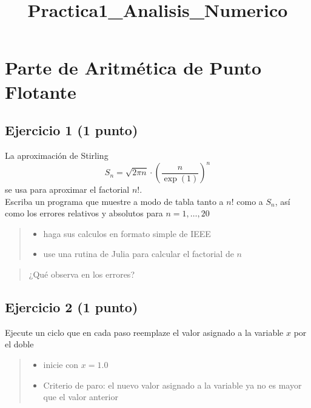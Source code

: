 \documentclass[11pt]{article}
\title{Practica1\_Analisis\_Numerico}
\providecommand{\tightlist}{%
      \setlength{\itemsep}{0pt}\setlength{\parskip}{0pt}}
\begin{document}
    
    
    \maketitle
    
    

    
    \section{Parte de Aritmética de Punto
Flotante}\label{parte-de-aritmuxe9tica-de-punto-flotante}

    \subsection{Ejercicio 1 (1 punto)}\label{ejercicio-1}
 La aproximación de Stirling
\[S_n=\sqrt{2\pi n}\cdot\left(\dfrac{n}{\exp(1)}\right)^n\] se usa para
aproximar el factorial \(n!\). \\
Escriba un programa que muestre a modo de tabla tanto a \(n!\) como a
\(S_n\), así como los errores relativos y absolutos para
\(n=1,\dots,20\) 

    \begin{quote}
\begin{itemize}
\tightlist
\item
   haga sus calculos en formato simple de IEEE
\item
   use una rutina de Julia para calcular el factorial de \(n\) 
\end{itemize}
\end{quote}

    \begin{quote}
 ¿Qué observa en los errores?
\end{quote}

    \subsection{Ejercicio 2 (1 punto)}\label{ejercicio-2}

 Ejecute un ciclo que en cada paso reemplaze el valor asignado a la
variable \(x\) por el doble 

    \begin{quote}
\begin{itemize}
\tightlist
\item
  inicie con \(x=1.0\)
\item
  Criterio de paro: el nuevo valor asignado a la variable ya no es mayor
  que el valor anterior
\end{itemize}
\end{quote}
\end{document}
